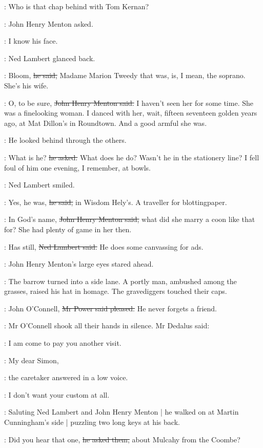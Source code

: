 \menton:
Who is that chap behind with Tom Kernan?

:
John Henry Menton asked.

\menton:
I know his face.

:
Ned Lambert glanced back.

\lambert:
Bloom,
\sout{he said,}
Madame Marion Tweedy that was,
is, I mean,
the soprano.
She's his wife.

\menton:
O, to be sure,
\sout{John Henry Menton said.}
I haven't seen her for some time.
She was a finelooking woman.
I danced with her, wait, fifteen seventeen golden years ago,
at Mat Dillon's in Roundtown.
And a good armful she was.

:
He looked behind through the others.

\menton:
What is he?
\sout{he asked.}
What does he do?
Wasn't he in the stationery line?
I fell foul of him one evening, I remember, at bowls.

:
Ned Lambert smiled.

\lambert:
Yes, he was,
\sout{he said,}
in Wisdom Hely's.
A traveller for blottingpaper.

\menton:
In God's name,
\sout{John Henry Menton said,}
what did she marry a coon like that for?
She had plenty of game in her then.

\lambert:
Has still,
\sout{Ned Lambert said.}
He does some canvassing for ads.

:
John Henry Menton's large eyes stared ahead.

:
The barrow turned into a side lane.
A portly man, ambushed among the grasses, raised his hat in homage.
The gravediggers touched their caps.

\power:
John O'Connell,
\sout{Mr Power said pleased.}
He never forgets a friend.

:
Mr O'Connell shook all their hands in silence.
Mr Dedalus said:

\simon:
I am come to pay you another visit.

\oconnell:
My dear Simon,

:
the caretaker answered in a low voice.

\oconnell:
I don't want your custom at all.

:
Saluting Ned Lambert and John Henry Menton |
he walked on at Martin Cunningham's side |
puzzling two long keys at his back.

\oconnell:
Did you hear that one,
\sout{he asked them,}
about Mulcahy from the Coombe?

